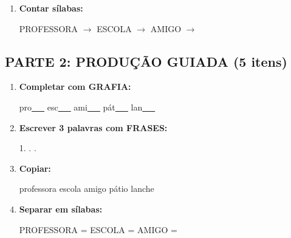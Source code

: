 \begin{exercicio}
\begin{enumerate}
  \item \textbf{Contar sílabas:}
  \begin{center}
  PROFESSORA $\rightarrow$ \underline{\hspace{0.9cm}} \quad ESCOLA $\rightarrow$ \underline{\hspace{0.9cm}} \quad AMIGO $\rightarrow$ \underline{\hspace{0.9cm}}
  \end{center}

\end{enumerate}

\subsection*{PARTE 2: PRODUÇÃO GUIADA (5 itens)}

\begin{enumerate}[resume]

  \item \textbf{Completar com GRAFIA:}
  \begin{center}
  pro\underline{~~~} \quad esc\underline{~~~} \quad ami\underline{~~~} \quad pát\underline{~~~} \quad lan\underline{~~~}
  \end{center}

  \item \textbf{Escrever 3 palavras com FRASES:}
  \begin{center}
  1. \underline{\hspace{3cm}} . \underline{\hspace{3cm}} . \underline{\hspace{3cm}}
  \end{center}

  \item \textbf{Copiar:}
  \begin{center}
  professora \quad escola \quad amigo \quad pátio \quad lanche
  \end{center}

  \item \textbf{Separar em sílabas:}
  \begin{center}
  PROFESSORA = \underline{\hspace{1cm}} \underline{\hspace{1cm}} \quad ESCOLA = \underline{\hspace{1cm}} \underline{\hspace{1cm}} \quad AMIGO = \underline{\hspace{1cm}} \underline{\hspace{1cm}}
  \end{center}


\end{enumerate}
\end{exercicio}
